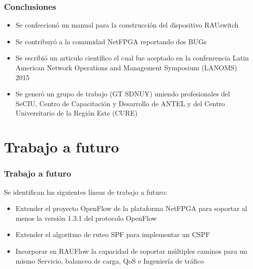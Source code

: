 \documentclass{beamer}
\begin{document}
\begin{frame}
\frametitle{Conclusiones} 

\begin{itemize}[<+->]
\item Se confeccion\'o un manual para la construcci\'on del dispositivo RAUswitch

\item Se contribuy\'o a la comunidad NetFPGA reportando dos BUGs

\item Se escribió un articulo cient\'ifico el cual fue aceptado en la confenrencia Latin American Network Operations and Management Symposium (LANOMS) 2015

\item Se gener\'o un grupo de trabajo (GT SDNUY) uniendo profesionales del SeCIU, Centro de Capacitación y Desarrollo de ANTEL y del Centro Universitario de la Región Este (CURE) 

\end{itemize}

\end{frame}



\section{Trabajo a futuro} 
\frame{\tableofcontents[currentsection]}

\begin{frame}
\frametitle{Trabajo a futuro} 

Se identifican las siguientes l\'ineas de trabajo a futuro:
\pause

\begin{itemize}[<+->]

\item Extender el proyecto OpenFlow de la plataforma NetFPGA para soportar al menos la versi\'on 1.3.1 del protocolo OpenFlow

\item Extender el algoritmo de ruteo SPF para implementar un CSPF

\item Incorporar en RAUFlow la capacidad de soportar m\'ultiples caminos para un mismo Servicio,  balanceo de carga, QoS e Ingenier\'ia de tr\'afico

\end{itemize}

\end{frame}
\end{document}
